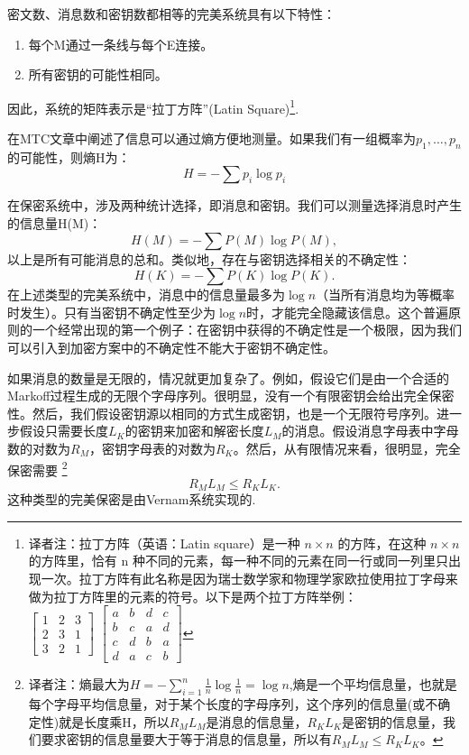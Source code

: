 \documentclass[]{article}
\begin{document}
密文数、消息数和密钥数都相等的完美系统具有以下特性：
\begin{enumerate}
	\item 每个M通过一条线与每个E连接。
	\item 所有密钥的可能性相同。
\end{enumerate}
因此，系统的矩阵表示是“拉丁方阵”(Latin Square)\footnote{译者注：拉丁方阵（英语：Latin square）是一种 $n\times n$ 的方阵，在这种 $n\times n$ 的方阵里，恰有 n 种不同的元素，每一种不同的元素在同一行或同一列里只出现一次。拉丁方阵有此名称是因为瑞士数学家和物理学家欧拉使用拉丁字母来做为拉丁方阵里的元素的符号。以下是两个拉丁方阵举例：\\
$\begin{bmatrix}
	1 & 2 & 3\\
	2 & 3 & 1\\
	3 & 2 & 1
\end{bmatrix}$
$\begin{bmatrix}
	a & b & d & c\\
	b & c & a & d\\
	c & d & b & a\\
	d & a & c & b
\end{bmatrix}$
}.


在MTC文章中阐述了信息可以通过熵方便地测量。如果我们有一组概率为$p_1,\ldots,p_n$的可能性，则熵H为：
\[H=-\sum p_i\log{p_i}\]

在保密系统中，涉及两种统计选择，即消息和密钥。我们可以测量选择消息时产生的信息量H(M)：
\[H(M)=-\sum P(M)\log{P(M)},\]
以上是所有可能消息的总和。类似地，存在与密钥选择相关的不确定性：
\[H(K)=-\sum P(K)\log{P(K)}.\]
在上述类型的完美系统中，消息中的信息量最多为$\log{n}$（当所有消息均为等概率时发生）。只有当密钥不确定性至少为$\log{n}$时，才能完全隐藏该信息。这个普遍原则的一个经常出现的第一个例子：在密钥中获得的不确定性是一个极限，因为我们可以引入到加密方案中的不确定性不能大于密钥不确定性。

如果消息的数量是无限的，情况就更加复杂了。例如，假设它们是由一个合适的Markoff过程生成的无限个字母序列。很明显，没有一个有限密钥会给出完全保密性。然后，我们假设密钥源以相同的方式生成密钥，也是一个无限符号序列。进一步假设只需要长度$L_K$的密钥来加密和解密长度$L_M$的消息。假设消息字母表中字母数的对数为$R_M$，密钥字母表的对数为$R_K$。然后，从有限情况来看，很明显，完全保密需要
\footnote{译者注：熵最大为$H=-\sum_{i=1}^{n}{\frac{1}{n}\log{\frac{1}{n}}}=\log{n}$,熵是一个平均信息量，也就是每个字母平均信息量，对于某个长度的字母序列，这个序列的信息量(或不确定性)就是长度乘H，所以$R_ML_M$是消息的信息量，$R_KL_K$是密钥的信息量，我们要求密钥的信息量要大于等于消息的信息量，所以有$R_M L_M \leq R_K L_K$。}
\[R_M L_M \leq R_K L_K.\]
这种类型的完美保密是由Vernam系统实现的.
\end{document}
